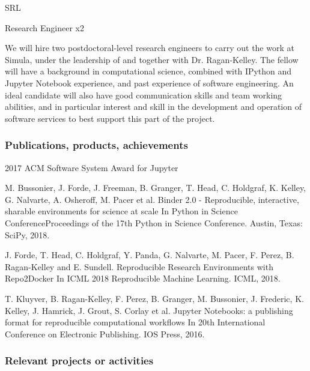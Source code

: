 \begin{sitedescription}{SRL}




\begin{participant}[PM=72, type=R]{Research Engineer x2}

We will hire two postdoctoral-level research engineers to carry out the work
at Simula, under the leadership of and together with Dr. Ragan-Kelley.  The
fellow will have a background in computational science, combined with IPython
and Jupyter Notebook experience, and past experience of software engineering.
An ideal candidate will also have good communication skills and team working
abilities, and in particular interest and skill in the development and
operation of software services to best support this part of the project.

\end{participant}


\subsubsection*{Publications, products, achievements}

\begin{compactenum}
\item 2017 ACM Software System Award for Jupyter
\item M. Bussonier, J. Forde, J. Freeman, B. Granger, T. Head, C. Holdgraf, K.
  Kelley, G. Nalvarte, A. Osheroff, M. Pacer et al. Binder 2.0 - Reproducible,
  interactive, sharable environments for science at scale In Python in Science
  ConferenceProceedings of the 17th Python in Science Conference. Austin,
  Texas: SciPy, 2018.
\item J. Forde, T. Head, C. Holdgraf, Y. Panda, G. Nalvarte, M. Pacer, F.
  Perez, B. Ragan-Kelley and E. Sundell. Reproducible Research Environments
  with Repo2Docker In ICML 2018 Reproducible Machine Learning. ICML, 2018.
\item T. Kluyver, B. Ragan-Kelley, F. Perez, B. Granger, M. Bussonier, J.
  Frederic, K. Kelley, J. Hamrick, J. Grout, S. Corlay et al. Jupyter
  Notebooks: a publishing format for reproducible computational workflows In
  20th International Conference on Electronic Publishing. IOS Press, 2016.

\end{compactenum}

\subsubsection*{Relevant projects or activities}


\end{sitedescription}
